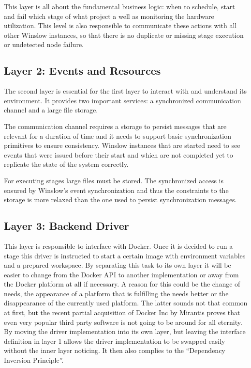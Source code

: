 This layer is all about the fundamental business logic: when to schedule, start and fail which stage of what project a well as monitoring the hardware utilization.
This level is also responsible to communicate these actions with all other Winslow instances, so that there is no duplicate or  missing stage execution or undetected node failure.


\subsection{Layer 2: Events and Resources}
\label{analysis:layer_2}

The second layer is essential for the first layer to interact with and understand its environment.
It provides two important services: a synchronized communication channel and a large file storage.

The communication channel requires a storage to persist messages that are relevant for a duration of time and it needs to  support basic synchronization primitives to ensure consistency.
Winslow instances that are started need to see events that were issued before their start and which are not completed yet to replicate the state of the system correctly.

For executing stages large files must be stored.
The synchronized access is ensured by Winslow's event synchronization and thus the constraints to the storage is more relaxed than the one used to persist synchronization messages.


\subsection{Layer 3: Backend Driver}
\label{analysis:layer_3}


This layer is responsible to interface with Docker.
Once it is decided to run a stage this driver is instructed to start a certain image with environment variables and a prepared workspace.
By separating this task to its own layer it will be easier to change from the Docker API to another implementation or away from the Docker platform at all if necessary.
A reason for this could be the change of needs, the appearance of a platform that is fulfilling the needs better or the disappearance of the currently used platform.
The latter sounds not that common at first, but the recent partial acquisition of Docker Inc by Mirantis\cite{docker:acquisition} proves that even very popular third party software is not going to be around for all eternity.
By moving the driver implementation into its own layer, but leaving the interface definition in layer 1 allows the driver implementation to be swapped easily without the inner layer noticing.
It then also complies to the \enquote{Dependency Inversion Principle}.

